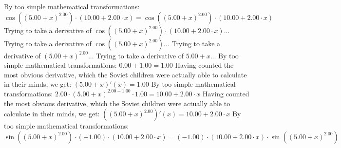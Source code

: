 \documentclass{article}
\begin{document}
\newline
By too simple mathematical transformations:
 ${ \cos {\left({\left({{5.00} + {x}}\right) ^ {2.00}}\right)}  \cdot \left({{10.00} + {{2.00} \cdot {x}}}\right)} = { \cos {\left({\left({{5.00} + {x}}\right) ^ {2.00}}\right)}  \cdot \left({{10.00} + {{2.00} \cdot {x}}}\right)}$ 
 \newline
 \newline 
Trying to take a derivative of ${ \cos {\left({\left({{5.00} + {x}}\right) ^ {2.00}}\right)}  \cdot \left({{10.00} + {{2.00} \cdot {x}}}\right)}$...\newline
\newline
Trying to take a derivative of $ \cos {\left({\left({{5.00} + {x}}\right) ^ {2.00}}\right)} $...\newline
\newline
Trying to take a derivative of ${\left({{5.00} + {x}}\right) ^ {2.00}}$...\newline
\newline
Trying to take a derivative of ${{5.00} + {x}}$...\newline
\newline
By too simple mathematical transformations:
 ${{0.00} + {1.00}} = {1.00}$ 
 \newline
 \newline 
Having counted the most obvious derivative, which the Soviet children were actually able to calculate in their minds, we get:
$({{5.00} + {x}})'(x) = {1.00}$\newline
\newline
By too simple mathematical transformations:
 ${{{2.00} \cdot {\left({{5.00} + {x}}\right) ^ {{2.00} - {1.00}}}} \cdot {1.00}} = {{10.00} + {{2.00} \cdot {x}}}$ 
 \newline
 \newline 
Having counted the most obvious derivative, which the Soviet children were actually able to calculate in their minds, we get:
$({\left({{5.00} + {x}}\right) ^ {2.00}})'(x) = {{10.00} + {{2.00} \cdot {x}}}$\newline
\newline
By too simple mathematical transformations:
 ${{ \sin {\left({\left({{5.00} + {x}}\right) ^ {2.00}}\right)}  \cdot \left({-1.00}\right)} \cdot \left({{10.00} + {{2.00} \cdot {x}}}\right)} = {\left({-1.00}\right) \cdot {\left({{10.00} + {{2.00} \cdot {x}}}\right) \cdot  \sin {\left({\left({{5.00} + {x}}\right) ^ {2.00}}\right)} }}$ 
 \newline
 \newline 
\end{document}

